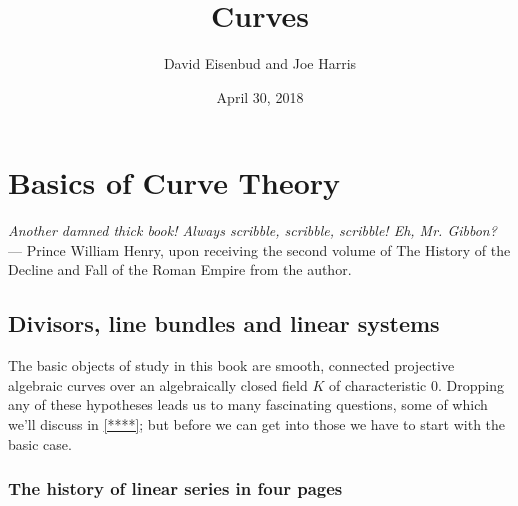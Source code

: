 \documentclass[12pt, leqno]{book}
\date{April 30, 2018}
\title{Curves}
\author{David Eisenbud and Joe Harris }
\begin{document}
\chapter{Basics of Curve Theory}

\begin{center}
\emph{Another damned thick book! Always scribble, scribble, scribble! Eh, Mr. Gibbon?} --- \scriptsize{Prince William Henry, upon receiving the second  volume of The History of the Decline and Fall of the Roman Empire from the author.}
\end{center}


%
%
%
%
%
%
%
%
%
%

\section{Divisors, line bundles and linear systems}


The basic objects of study in this book are smooth, connected projective algebraic curves over an algebraically closed field $K$ of characteristic 0. Dropping any of these hypotheses leads us to many fascinating questions, some of which we'll discuss in \ref{****}; but before we can get into those we have to start with the basic case.


\subsection{The history of linear series in four pages}
\end{document}
